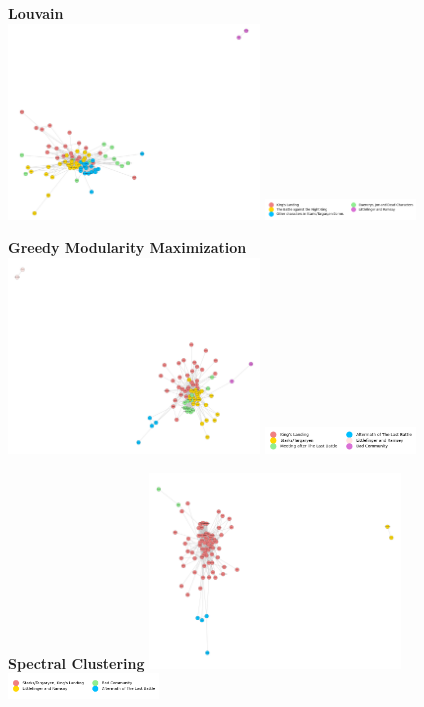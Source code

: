 \documentclass[10pt,twocolumn,letterpaper]{article}
\begin{document}
\begin{center}
    \textbf{Louvain} \\
    \includegraphics[width=0.5\textwidth]{img/s8/communities_louvain.jpg}
    \includegraphics[width=0.3\textwidth]{img/s8/louvain_legend.jpg}\\
    \caption{\small{$\#communities=6$, $modularity=0.67$}}
\end{center}



\begin{center}
    \textbf{Greedy Modularity Maximization}\\
    \includegraphics[width=0.5\textwidth]{img/s8/communities_gmm.jpg}
    \includegraphics[width=0.3\textwidth]{img/s8/gmm_legend.jpg}\\
    \caption{\small{$\#communities=5$, $modularity=0.66$}}
\end{center}

\begin{center}
    \textbf{Spectral Clustering}
    \includegraphics[width=0.5\textwidth]{img/s8/communities_sc.jpg}
    \includegraphics[width=0.3\textwidth]{img/s8/sc_legend.jpg}\\
    \caption{\small{$\#communities=6$, $modularity=0.634$}}
\end{center}
\end{document}
